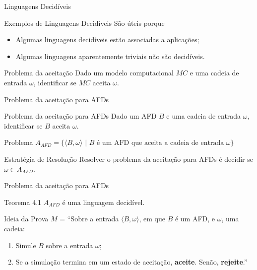 \documentclass[xcolor=dvipsnames,table]{beamer}
\begin{document}
	\begin{frame}{Linguagens Decidíveis}
		\begin{block}{Exemplos de Linguagens Decidíveis}
			São úteis porque
			\begin{itemize}
				\item Algumas linguagens decidíveis estão associadas a aplicações;
				\item Algumas linguagens aparentemente triviais não são decidíveis.
			\end{itemize}
		\end{block} \pause
		\begin{block}{Problema da aceitação}
			Dado um modelo computacional $MC$ e uma cadeia de entrada $\omega$, identificar se $MC$ aceita $\omega$.
		\end{block}	
	\end{frame}
	
	\begin{frame}{Problema da aceitação para AFDs}
		\begin{block}{Problema da aceitação para AFDs}
			Dado um AFD $B$ e uma cadeia de entrada $\omega$, identificar se $B$ aceita $\omega$.
		\end{block}	\pause
		\begin{block}{Problema}
			$A_{AFD} = \{ \langle B, \omega \rangle \mbox{ | } B \mbox{ é um AFD que aceita a cadeia de entrada } \omega \}$
		\end{block} \pause
		\begin{block}{Estratégia de Resolução}
			Resolver o problema da aceitação para AFDs é decidir se $\omega \in A_{AFD}$.
		\end{block}
	\end{frame}
	
	\begin{frame}{Problema da aceitação para AFDs}
		\begin{block}{Teorema 4.1}
			$A_{AFD}$ é uma linguagem decidível.
		\end{block} \pause
		\begin{block}{Ideia da Prova}
			$M$ = ``Sobre a entrada $\langle B, \omega \rangle$, em que $B$ é um AFD, e $\omega$, uma cadeia:
			\begin{enumerate}
				\item Simule $B$ sobre a entrada $\omega$;
				\item Se a simulação termina em um estado de aceitação, {\bf aceite}. Senão, {\bf rejeite}.''
			\end{enumerate}
		\end{block}
	\end{frame}
	
	\begin{frame}
		\titlepage
	\end{frame}
	
\end{document}
